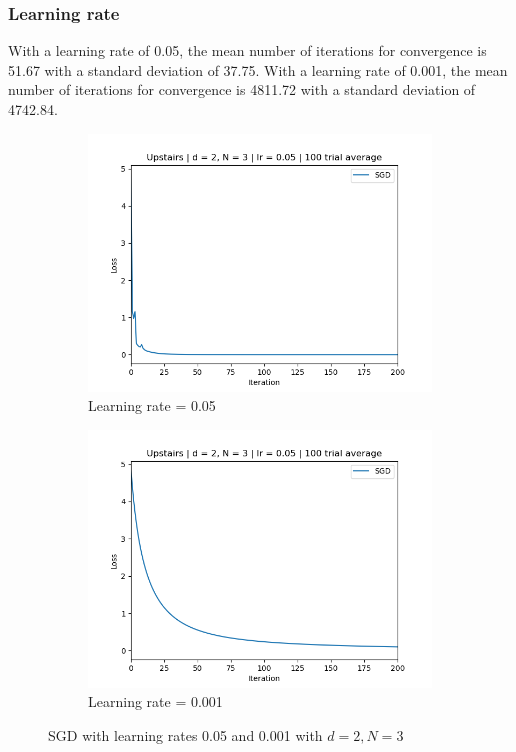 \documentclass[11pt]{article}
\begin{document}
\subsubsection{Learning rate}
With a learning rate of 0.05, the mean number of iterations for convergence is 51.67 with a standard deviation of 37.75. With a learning rate of 0.001, the mean number of iterations for convergence is 4811.72 with a standard deviation of 4742.84.
\begin{figure}[h!]
    \begin{subfigure}{0.5\textwidth}
        \centering
        \includegraphics[width=\textwidth]{images/upstairs_avg_lr5e-2.png}
        \caption{Learning rate = 0.05}
        \label{fig:upstairs_avg_lr}
    \end{subfigure}
    \begin{subfigure}{0.5\textwidth}
        \centering
        \includegraphics[width=\textwidth]{images/upstairs_avg_lr1e-3.png}
        \caption{Learning rate = 0.001}
        \label{fig:upstairs_1_lr}
    \end{subfigure}
    \caption{SGD with learning rates 0.05 and 0.001 with $d = 2, N = 3$}
    \label{fig:results:lr}
\end{figure}
\end{document}
